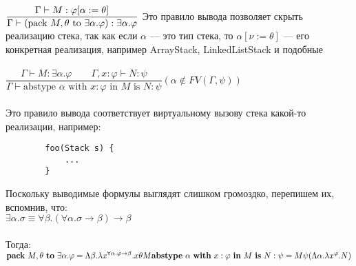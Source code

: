 	
 	$\dfrac{\Gamma \vdash M : \varphi[\alpha := \theta]}{\Gamma\vdash (\text{pack } M, \theta \text{ to } \exists \alpha . \varphi) : \exists \alpha.\varphi}\\ \\ \\
	$ Это правило вывода позволяет скрыть реализацию стека, так как если $\alpha$ --- это тип стека, то $\alpha[\nu := \theta]$ --- его конкретная реализация, например ArrayStack, LinkedListStack и подобные \\ \\
 	 $
 	\dfrac{\Gamma \vdash M : \exists \alpha . \varphi\qquad\Gamma, x : \varphi \vdash N : \psi}{\Gamma \vdash \text{abstype } \alpha \text{ with } x:\varphi \text{ in } M \text{ is } N:\psi}
	(\alpha \notin FV(\Gamma, \psi))$
	\\ \\
	Это правило вывода соответствует виртуальному вызову стека какой-то реализации, например: 
	\begin{verbatim}
		foo(Stack s) {
			...
		}
	\end{verbatim}
	Поскольку выводимые формулы выглядят слишком громоздко, перепишем их, вспомнив, что: \\
	$\exists\alpha.\sigma\equiv\forall\beta.(\forall\alpha.\sigma\rightarrow\beta)\rightarrow\beta$\\\\
	Тогда: \\
	$	\text{\textbf{pack} } M, \theta \text{ \textbf{to} } \exists \alpha . \varphi =
		\Lambda \beta . \lambda x^{\forall \alpha . \varphi \to \beta} . x \theta M \\
		\text{\textbf{abstype} } \alpha \text{ \textbf{with} } x:\varphi \text{ \textbf{in} } M \text{ \textbf{is} } N:\psi =
		M \psi (\Lambda \alpha . \lambda x ^ \varphi . N)
	$
 
 	 

